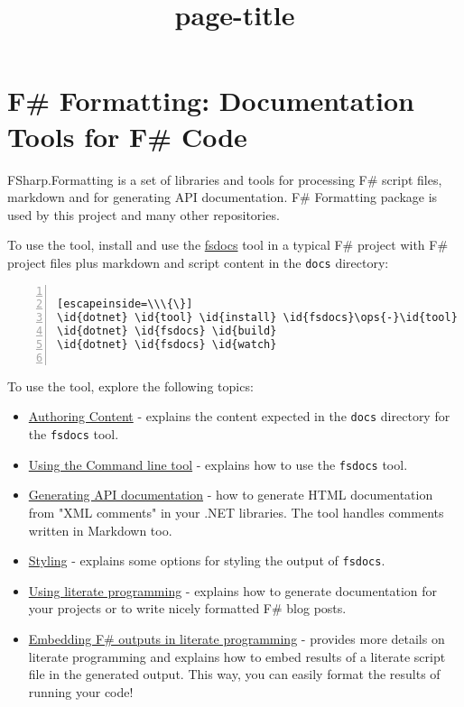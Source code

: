 \documentclass{article}
\title{{page-title}}
\date{}
\newcommand{\id}[1]{\textcolor{black}{#1}}
\newcommand{\ops}[1]{\textcolor{purple}{#1}}
\begin{document}
\maketitle

\section*{F\# Formatting: Documentation Tools for F\# Code}



FSharp.Formatting is a set of libraries and tools for processing F\# script files, markdown and for
generating API documentation. F\# Formatting package is used by this project and many other repositories.


To use the tool, install and use the \href{commandline.html}{fsdocs} tool in a typical F\# project with
F\# project files plus markdown and script content in the \texttt{docs} directory:
\begin{lstlisting}[numbers=left]

[escapeinside=\\\{\}]
\id{dotnet} \id{tool} \id{install} \id{fsdocs}\ops{-}\id{tool}
\id{dotnet} \id{fsdocs} \id{build} 
\id{dotnet} \id{fsdocs} \id{watch}


\end{lstlisting}



To use the tool, explore the following topics:
\begin{itemize}
\item 

\href{content.html}{Authoring Content} - explains the content expected in the \texttt{docs} directory for the \texttt{fsdocs} tool.

\item 

\href{commandline.html}{Using the Command line tool} - explains how to use the \texttt{fsdocs} tool.

\item 

\href{apidocs.html}{Generating API documentation} - how to generate HTML documentation
from "XML comments" in your .NET libraries. The tool handles comments written in
Markdown too.

\item 

\href{styling.html}{Styling} - explains some options for styling the output of \texttt{fsdocs}.

\item 

\href{literate.html}{Using literate programming} - explains how to generate documentation
for your projects or to write nicely formatted F\# blog posts.

\item 

\href{evaluation.html}{Embedding F\# outputs in literate programming} - provides more details on literate programming and
explains how to embed results of a literate script file in the generated output. This way,
you can easily format the results of running your code!

\end{itemize}
\end{document}

